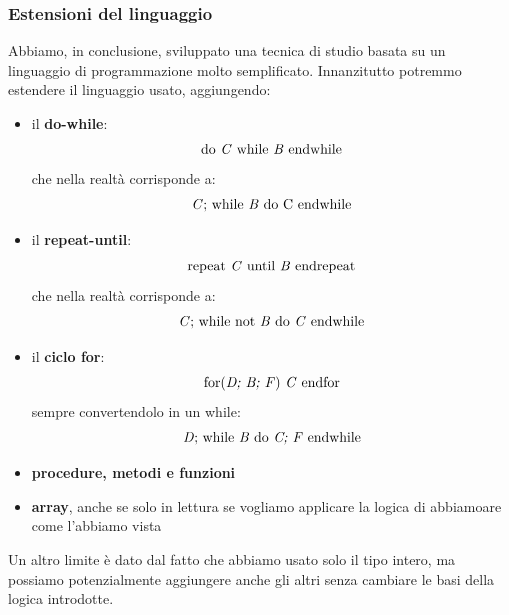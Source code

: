 				      				\subsubsection{Estensioni del linguaggio}
				      				Abbiamo, in conclusione, sviluppato una tecnica di studio basata su un
				      				linguaggio di programmazione molto semplificato. Innanzitutto potremmo estendere
				      				il linguaggio usato, aggiungendo:
				      				\begin{itemize}
				      					\item il \textbf{do-while}:
				      					      \[\mbox{do \textit{C} while \textit{B} endwhile}\]
				      					      che nella realtà corrisponde a:
				      					      \[\mbox{\textit{C}; while \textit{B} do
				      					      		\textnormal{C} endwhile}\]
				      					      	\item il \textbf{repeat-until}:
				      					      	\[\mbox{repeat \textit{C} until \textit{B} endrepeat}\]
				      					      	che nella realtà corrisponde a:
				      					      	\[\mbox{\textit{C}; while not \textit{B} do
				      					      			\textit{C} endwhile}\]
				      					      		\item il \textbf{ciclo for}:
				      					      		\[\mbox{for(\textit{D; B; F}) \textit{C} endfor} \]
				      					      		sempre convertendolo in un while:
				      					      		\[\mbox{\textit{D}; while \textit{B} do
				      					      				\textit{C; F}  endwhile}\]
				      					      			\item \textbf{procedure, metodi e funzioni}
				      					      			\item \textbf{array}, anche se solo in lettura se vogliamo applicare la logica
				      					      			di abbiamoare come l'abbiamo vista
				      					      			\end{itemize}
				      					      			Un altro limite è dato dal fatto che abbiamo usato solo il tipo intero, ma
				      					      			possiamo potenzialmente aggiungere anche gli altri senza cambiare le basi della
				      					      			logica introdotte.
